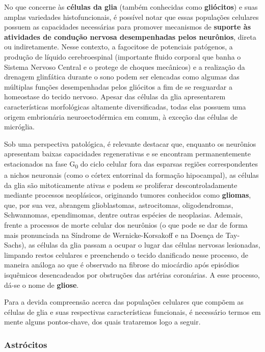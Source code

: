 \documentclass[
]{book}
\begin{document}
No que concerne às \textbf{células da glia} (também conhecidas como \textbf{gliócitos}) e suas amplas variedades histofuncionais, é possível notar que essas populações celulares possuem as capacidades necessárias para promover mecanismos de \textbf{suporte às atividades de condução nervosa desempenhadas pelos neurônios}, direta ou indiretamente. Nesse contexto, a fagocitose de potenciais patógenos, a produção de líquido cerebroespinal (importante fluido corporal que banha o Sistema Nervoso Central e o protege de choques mecânicos) e a realização da drenagem glinfática durante o sono podem ser elencadas como algumas das múltiplas funções desempenhadas pelos gliócitos a fim de se resguardar a homeostase do tecido nervoso. Apesar das células da glia apresentarem características morfológicas altamente diversificadas, todas elas possuem uma origem embrionária neuroectodérmica em comum, à exceção das células de micróglia.

Sob uma perspectiva patológica, é relevante destacar que, enquanto os neurônios apresentam baixas capacidades regenerativas e se encontram permanentemente estacionados na fase G\textsubscript{0} do ciclo celular fora das esparsas regiões correspondentes a nichos neuronais (como o córtex entorrinal da formação hipocampal), as células da glia são mitoticamente ativas e podem se proliferar descontroladamente mediante processos neoplásicos, originando tumores conhecidos como \textbf{gliomas}, que, por sua vez, abrangem glioblastomas, astrocitomas, oligodendromas, Schwannomas, ependimomas, dentre outras espécies de neoplasias. Ademais, frente a processos de morte celular dos neurônios (o que pode se dar de forma mais pronunciada na Síndrome de Wernicke-Korsakoff e na Doença de Tay-Sachs), as células da glia passam a ocupar o lugar das células nervosas lesionadas, limpando restos celulares e preenchendo o tecido danificado nesse processo, de maneira análoga ao que é observado na fibrose do miocárdio após episódios isquêmicos desencadeados por obstruções das artérias coronárias. A esse processo, dá-se o nome de \textbf{gliose}.

Para a devida compreensão acerca das populações celulares que compõem as células de glia e suas respectivas características funcionais, é necessário termos em mente alguns pontos-chave, dos quais trataremos logo a seguir.

\hypertarget{astruxf3citos}{%
\subsubsection*{Astrócitos}\label{astruxf3citos}}
\end{document}
